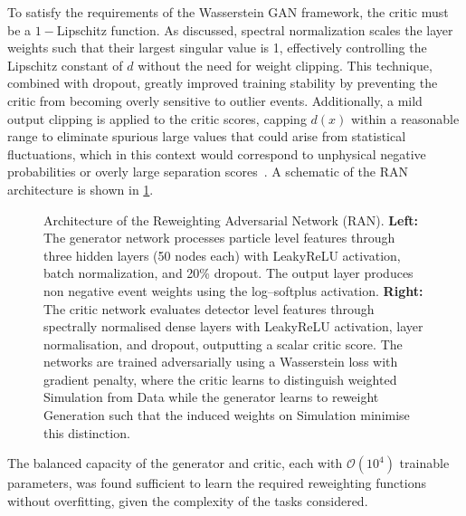 {{        To satisfy the requirements of the Wasserstein GAN framework, the critic must be a \(1-\)Lipschitz function.
        As discussed, spectral normalization scales the layer weights such that their largest singular value is 1, effectively controlling the Lipschitz constant of $d$ without the need for weight clipping.
        This technique, combined with dropout, greatly improved training stability by preventing the critic from becoming overly sensitive to outlier events.
        Additionally, a mild output clipping is applied to the critic scores, capping $d(x)$ within a reasonable range to eliminate spurious large values that could arise from statistical fluctuations, which in this context would correspond to unphysical negative probabilities or overly large separation scores~\cite{dai_rethinking_2022, arjovsky_wasserstein_2017}.
        A schematic of the RAN architecture is shown in \cref{fig:model-arch}.
        \begin{figure}
    
    \caption[RAN architecture with generator and critic networks]{Architecture of the Reweighting Adversarial Network (RAN). 
    \textbf{Left:} The generator network processes particle level features through three hidden layers (50 nodes each) with LeakyReLU activation, batch normalization, and 20\% dropout. The output layer produces non negative event weights using the log--softplus activation.
    \textbf{Right:} The critic network evaluates detector level features through spectrally normalised dense layers with LeakyReLU activation, layer normalisation, and dropout, outputting a scalar critic score.
    The networks are trained adversarially using a Wasserstein loss with gradient penalty, where the critic learns to distinguish weighted Simulation from Data while the generator learns to reweight Generation such that the induced weights on Simulation minimise this distinction.}
    \label{fig:model-arch}
\end{figure}

        The balanced capacity of the generator and critic, each with $\mathcal{O}(10^4)$ trainable parameters, was found sufficient to learn the required reweighting functions without overfitting, given the complexity of the tasks considered.

}}

